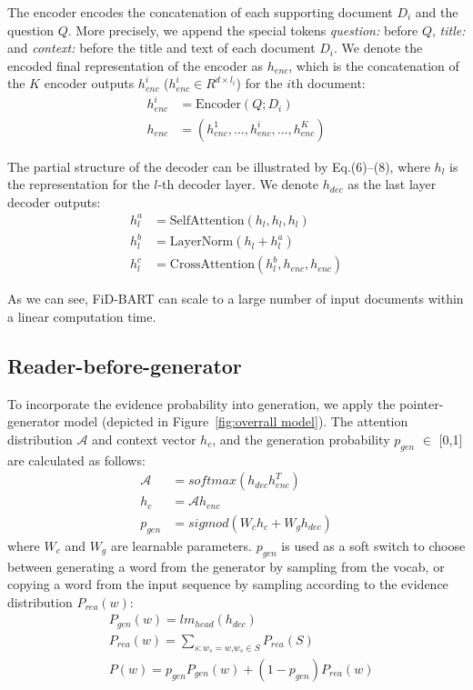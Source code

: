 \documentclass[11pt]{article}
\begin{document}
The encoder encodes the concatenation of each supporting document $D_i$ and the question $Q$. More precisely, we append the special tokens \textit{question:} before $Q$, \textit{title:} and \textit{context:} before the title and text of each document $D_i$. We denote the encoded final representation of the encoder as $h_{enc}$,  which is the concatenation of the $K$ encoder outputs $h^i_{enc}$ ($h^i_{enc} \in R^{d \times l_i}$) for the $i$th document:
\begin{align}
    h^i_{enc} &= \text{Encoder}(Q;D_i) \\
    h_{enc} &= (h^1_{enc},..., h^i_{enc},..., h^K_{enc}) 
\end{align}

The partial structure of the decoder can be illustrated by Eq.(6)--(8), where $h_l$ is the representation for the $l$-th decoder layer. We denote $h_{dec}$ as the last layer decoder outputs: 
\vspace{-3pt}
\begin{align}
h_l^a &= \text{SelfAttention}(h_l, h_l, h_l) \\
    h_l^b &= \text{LayerNorm}(h_l + h_l^a) \\
\label{cross-attention}    h_l^c &= \text{CrossAttention}(h_l^b, h_{enc}, h_{enc})
\end{align}

\vspace{-3pt}
As we can see, FiD-BART can scale to a large number of input documents within a linear computation time.
\vspace{-7pt}
\subsection{Reader-before-generator}
\vspace{-5pt}
To incorporate the evidence probability into generation, we apply the pointer-generator model (depicted in Figure~\ref{fig:overrall model}). The attention distribution $\mathcal{A}$ and context vector $h_c$, and the generation probability $p_{gen}$ $\in$ [0,1] are calculated as follows:
\begin{align}
    \mathcal{A} &= softmax(h_{dec} h^T_{enc}) \\
    h_{c} &= \mathcal{A}  h_{enc} \\
    p_{gen} &= sigmod(W_{c}h_{c} + W_{g}h_{dec}) 
\end{align}
where $W_c$ and $W_g$ are learnable parameters. $p_{gen}$ is used as a soft switch to choose between generating a word from the generator by sampling from the vocab, or copying a word from the input sequence by sampling according to the evidence distribution $P_{rea}(w)$:
\begin{align}
&P_{gen}(w) = lm_{head}(h_{dec}) \\
&P_{rea}(w) = \sum\nolimits_{s:w_s=w\text{,}w_s \in S}{P_{rea}(S)} \\
&P(w) = p_{gen}P_{gen}(w) + (1-p_{gen})P_{rea}(w)
\end{align}
\end{document}
